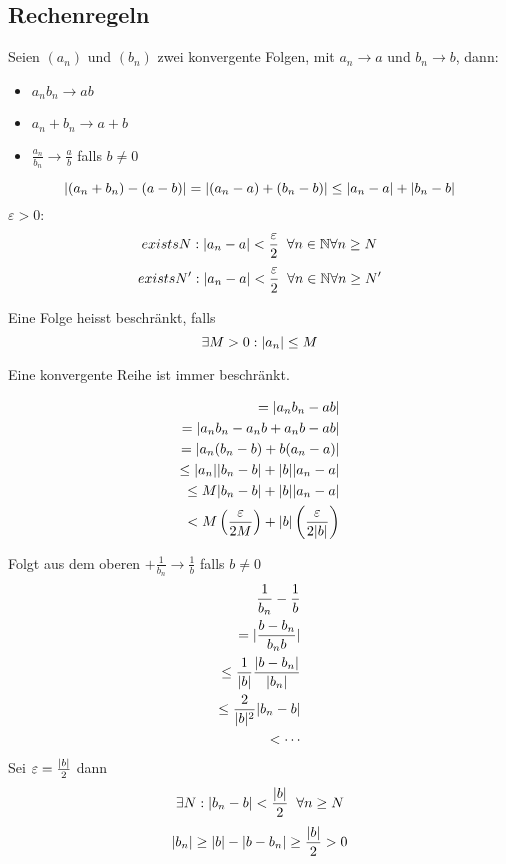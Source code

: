 \subsection{Rechenregeln}
\begin{Sat}
  Seien $(a_n)$ und $(b_n)$ zwei konvergente Folgen, mit $a_n\to a$ und $b_n\to b$, dann:
  \begin{itemize}
    \item $a_n b_n\to ab$
    \item $a_n+b_n\to a+b$
    \item $\frac{a_n}{b_n}\to\frac{a}{b}$ falls $b\neq 0$
  \end{itemize}
\end{Sat}
\begin{Bew}
  \[\mathopen| \left( a_n+b_n \right)-\left( a-b \right) \mathclose|=\mathopen| \left( a_n-a \right)+\left( b_n-b \right) \mathclose|\leq\mathopen| a_n-a \mathclose|+\mathopen| b_n-b \mathclose|\]
  $\varepsilon>0$:
  \[exists N:\mathopen| a_n-a \mathclose|<\frac{\varepsilon}{2}\hspace{2mm}\forall n\in\mathbb{N}\forall n\geq N\]
  \[exists N':\mathopen| a_n-a \mathclose|<\frac{\varepsilon}{2}\hspace{2mm}\forall n\in\mathbb{N}\forall n\geq N'\]
\end{Bew}
\begin{Def}
  Eine Folge heisst beschränkt, falls
  \[\exists M>0:\mathopen| a_n \mathclose|\leq M\]
\end{Def}
\begin{Lem}
  Eine konvergente Reihe ist immer beschränkt.
\end{Lem}
\begin{Bew}
  \begin{align*}
    = \mathopen| a_nb_n-ab \mathclose|\\
    = \mathopen| a_nb_n-a_nb+a_nb-ab \mathclose|\\
    = \mathopen| a_n(b_n-b)+b(a_n-a) \mathclose|\\
    \leq \mathopen| a_n \mathclose|\mathopen| b_n-b \mathclose|+\mathopen| b \mathclose|\mathopen| a_n-a \mathclose|\\
    \leq M\mathopen| b_n-b \mathclose|+\mathopen| b \mathclose|\mathopen| a_n-a \mathclose|\\
    < M\left( \frac{\varepsilon}{2M}\right)+\mathopen| b \mathclose|\left( \frac{\varepsilon}{2\mathopen| b \mathclose|} \right)
  \end{align*}
\end{Bew}
\begin{Bew}
  Folgt aus dem oberen $+\frac{1}{b_n}\to\frac{1}{b}$ falls $b\neq 0$
  \begin{align*}
    \frac{1}{b_n}-\frac{1}{b}\\
    =\mathopen| \frac{b-b_n}{b_nb} \mathclose|\\
    \leq\frac{1}{\mathopen| b \mathclose|}\frac{\mathopen| b-b_n \mathclose|}{\mathopen| b_n \mathclose|}\\
    \leq\frac{2}{\mathopen| b \mathclose|^2}\mathopen| b_n-b \mathclose|\\
    < \cdots
  \end{align*}
  Sei $\varepsilon=\frac{\mathopen| b \mathclose|}{2}$ dann
  \[\exists N:\mathopen| b_n-b \mathclose|<\frac{\mathopen| b \mathclose|}{2}\hspace{2mm}\forall n\geq N\]
  \[\mathopen| b_n \mathclose|\geq \mathopen| b \mathclose|-\mathopen| b-b_n \mathclose|\geq \frac{\mathopen| b \mathclose|}{2}>0\]
\end{Bew}
